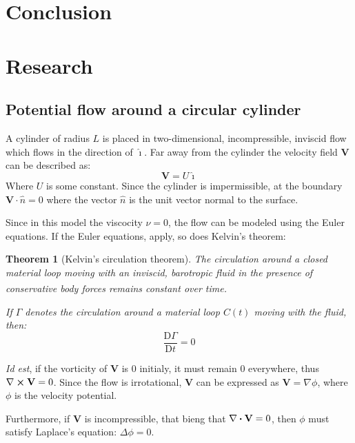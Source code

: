 \documentclass[a4paper,12pt]{article}
\renewcommand\divergence[1]{\nabla\vdot#1}
\renewcommand\curl[1]{\nabla\cp#1}
\newcommand{\ihat}{\hat{\imath}}
\newcommand{\nhat}{\hat{n}}
\newcommand{\materialder}[2]{\frac{\mathrm{D} #1}{\mathrm{D} #2}}   %
\newcommand{\needcitation}{\textsuperscript{\normalfont[Citation needed]}}		%
\newtheorem{theorem}{Theorem}[section]
\begin{document}
\section{Conclusion}

\newpage


\renewcommand{\listfigurename}{\thesection\hspace{20pt}List of Figures}\listoffigures

\newpage
\section{Research}
\subsection{Potential flow around a circular cylinder}
A cylinder of radius $L$ is placed in two-dimensional, incompressible, inviscid flow which flows in the direction of $\ihat$.
Far away from the cylinder the velocity field $\mathbf{V}$ can be described as: 
\begin{equation}\label{equation:in-infinitum}
	\mathbf{V}=U\ihat
\end{equation}
Where $U$ is some constant. Since the cylinder is impermissible, at the boundary $\mathbf{V}\cdot\nhat=0$ where the vector $\nhat$ is the unit vector normal to the surface. 

Since in this model the viscocity $\nu=0$, the flow can be modeled using the Euler equations. If the Euler equations, apply, so does Kelvin's theorem:
\begin{theorem}[Kelvin's circulation theorem]
	The circulation around a closed material loop moving with an inviscid, barotropic fluid in the presence of conservative body forces remains constant over time.\needcitation
	
	If $\Gamma$ denotes the circulation around a material loop $C(t)$ moving with the fluid, then:
	$$\materialder{\Gamma}{t}=0$$
\end{theorem}

\textit{Id est}, if the vorticity of $\mathbf{V}$ is $0$ initialy, it must remain $0$ everywhere, thus $\curl\mathbf{V}=0$. Since the flow is irrotational, $\mathbf{V}$ can be expressed as $\mathbf{V}=\nabla\phi$, where $\phi$ is the velocity potential.

Furthermore, if $\mathbf{V}$ is incompressible, that bieng that $\divergence\mathbf{V}=0$, then $\phi$ must satisfy Laplace's equation: $\Delta\phi=0$.
\end{document}

